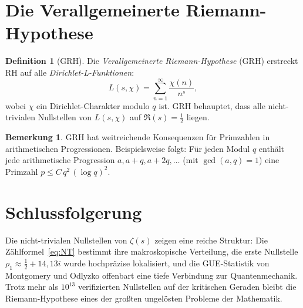 \documentclass[12pt,a4paper]{amsart}
\theoremstyle{definition}
\newtheorem{definition}[theorem]{Definition}
\newtheorem{remark}[theorem]{Bemerkung}
\begin{document}
\section{Die Verallgemeinerte Riemann-Hypothese}

\begin{definition}[GRH]
\label{def:grh}
Die \emph{Verallgemeinerte Riemann-Hypothese} (GRH) erstreckt RH auf alle
\emph{Dirichlet-L-Funktionen}:
\[
  L(s, \chi) = \sum_{n=1}^{\infty} \frac{\chi(n)}{n^s},
\]
wobei $\chi$ ein Dirichlet-Charakter modulo $q$ ist.
GRH behauptet, dass alle nicht-trivialen Nullstellen von $L(s,\chi)$
auf $\Re(s) = \tfrac{1}{2}$ liegen.
\end{definition}

\begin{remark}
GRH hat weitreichende Konsequenzen f\"ur Primzahlen in arithmetischen
Progressionen. Beispielsweise folgt: F\"ur jeden Modul $q$ enth\"alt jede
arithmetische Progression $a, a+q, a+2q,\ldots$ (mit $\gcd(a,q)=1$) eine
Primzahl $p \le C\,q^2\,(\log q)^2$.
\end{remark}

\section{Schlussfolgerung}

Die nicht-trivialen Nullstellen von $\zeta(s)$ zeigen eine reiche Struktur:
Die Z\"ahlformel~\eqref{eq:NT} bestimmt ihre makroskopische Verteilung,
die erste Nullstelle $\rho_1 \approx \tfrac{1}{2} + 14{,}13i$ wurde hochpr\"azise
lokalisiert, und die GUE-Statistik von Montgomery und Odlyzko offenbart
eine tiefe Verbindung zur Quantenmechanik.
Trotz mehr als $10^{13}$ verifizierten Nullstellen auf der kritischen
Geraden bleibt die Riemann-Hypothese eines der gro\ss ten ungel\"osten Probleme
der Mathematik.
\end{document}
